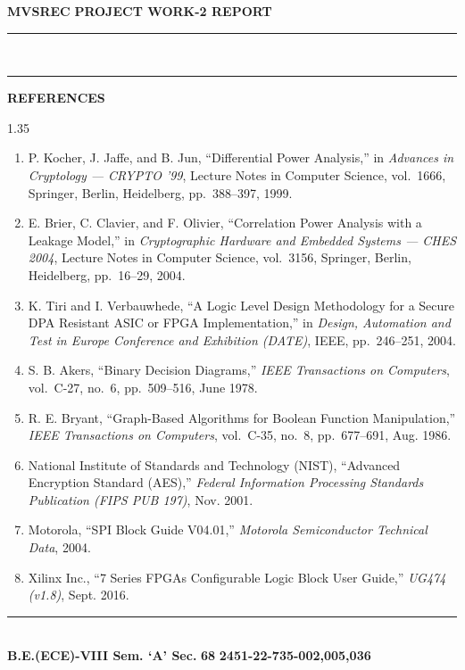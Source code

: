 \documentclass[12pt,a4paper]{article}
\begin{document}
\noindent
{\small\textbf{MVSREC}} \hfill {\small\textbf{PROJECT WORK-2 REPORT}}\\[-0.2cm]
\noindent\rule{\textwidth}{1.8pt}\\[-0.55cm]
\noindent\rule{\textwidth}{0.6pt}

\vspace{1.0cm}

\begin{center}
    {\fontsize{14}{17}\selectfont \textbf{REFERENCES}}
\end{center}

\vspace{0.6cm}

\begin{spacing}{1.35}
\begin{enumerate}
    \setlength{\itemsep}{0.45cm}

    \item P. Kocher, J. Jaffe, and B. Jun, ``Differential Power Analysis,'' in \textit{Advances in Cryptology --- CRYPTO '99}, Lecture Notes in Computer Science, vol.~1666, Springer, Berlin, Heidelberg, pp.~388--397, 1999.

    \item E. Brier, C. Clavier, and F. Olivier, ``Correlation Power Analysis with a Leakage Model,'' in \textit{Cryptographic Hardware and Embedded Systems --- CHES 2004}, Lecture Notes in Computer Science, vol.~3156, Springer, Berlin, Heidelberg, pp.~16--29, 2004.

    \item K. Tiri and I. Verbauwhede, ``A Logic Level Design Methodology for a Secure DPA Resistant ASIC or FPGA Implementation,'' in \textit{Design, Automation and Test in Europe Conference and Exhibition (DATE)}, IEEE, pp.~246--251, 2004.

    \item S. B. Akers, ``Binary Decision Diagrams,'' \textit{IEEE Transactions on Computers}, vol.~C-27, no.~6, pp.~509--516, June 1978.

    \item R. E. Bryant, ``Graph-Based Algorithms for Boolean Function Manipulation,'' \textit{IEEE Transactions on Computers}, vol.~C-35, no.~8, pp.~677--691, Aug. 1986.

    \item National Institute of Standards and Technology (NIST), ``Advanced Encryption Standard (AES),'' \textit{Federal Information Processing Standards Publication (FIPS PUB 197)}, Nov. 2001.

    \item Motorola, ``SPI Block Guide V04.01,'' \textit{Motorola Semiconductor Technical Data}, 2004.

    \item Xilinx Inc., ``7 Series FPGAs Configurable Logic Block User Guide,'' \textit{UG474 (v1.8)}, Sept. 2016.
\end{enumerate}
\end{spacing}

\vfill

\noindent\rule{\textwidth}{0.8pt}\\[0.15cm]
\noindent
{\small\textbf{B.E.(ECE)-VIII Sem. `A' Sec.}} \hfill {\small\textbf{68}} \hfill {\small\textbf{2451-22-735-002,005,036}}
\end{document}
